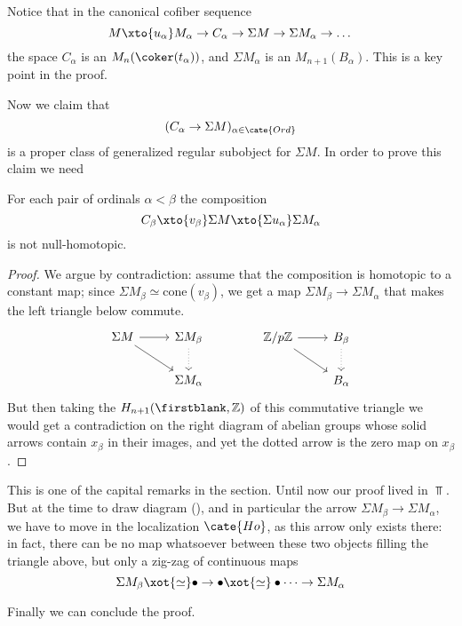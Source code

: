 \begin{remark}
Notice that in the canonical cofiber sequence
\[
M \xto{u_\alpha} M_\alpha \to C_\alpha \to \Sigma M \to \Sigma M_\alpha\to\dots
\]
the space $C_\alpha$ is an $M_n(\coker(t_\alpha))$, and $\Sigma M_\alpha$ is an $M_{n+1}(B_\alpha)$. This is a key point in the proof.
\end{remark}
Now we claim that $$(C_{\alpha} \to \Sigma M)_{\alpha \in \cate{Ord}}$$ is a proper class of generalized regular subobject for $\Sigma M$. In order to prove this claim we need
\begin{proposition}
\label{key}
For each pair of ordinals $\alpha < \beta$ the composition
\[
C_\beta \xto{v_\beta} \Sigma M \xto{\Sigma u_{\alpha}} \Sigma M_\alpha
\]
is not null-homotopic.
\end{proposition}
\begin{proof}
We argue by contradiction: assume that the composition is homotopic to a constant map; since $\Sigma M_\beta \simeq \text{cone}(v_\beta)$, we get a map $\Sigma M_\beta \to \Sigma M_\alpha$ that makes the left triangle below commute.
\[\label{the-diag}
\begin{tikzcd}
\Sigma M \ar[r]\ar[dr]& \Sigma M_\beta \ar[dotted, d]\\
& \Sigma M_\alpha
\end{tikzcd}
\qquad\qquad
\begin{tikzcd}
\mathbb{Z}/p\mathbb{Z} \ar[r]\ar[dr]& B_\beta \ar[dotted, d]\\
& B_\alpha
\end{tikzcd}
\]
But then taking the $H_{n+1}(\firstblank, \mathbb{Z})$ of this commutative triangle we would get a contradiction on the right diagram of abelian groups whose solid arrows contain $x_\beta$ in their images, and yet the dotted arrow is the zero map on $x_\beta$.
\end{proof}
\begin{remark}
This is one of the capital remarks in the section. Until now our proof lived in $\Top$. But at the time to draw diagram (), and in particular the arrow $\Sigma M_\beta \to \Sigma M_\alpha$, we have to move in the localization $\cate{Ho}$, as this arrow only exists there: in fact, there can be no map whatsoever between these two objects filling the triangle above, but only a zig-zag of continuous maps
\[
\Sigma M_\beta \xot{\simeq} \bullet \to \bullet \xot{\simeq} \bullet \dots \to \Sigma M_\alpha
\]
\end{remark}

Finally we can conclude the proof.

